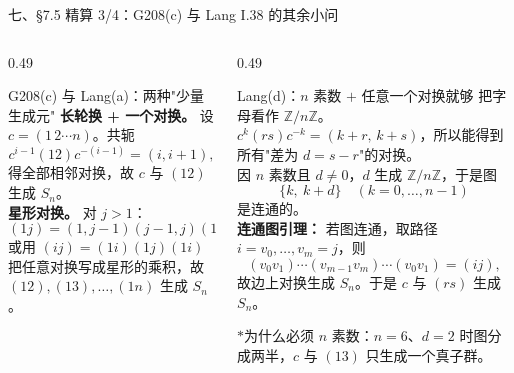 \documentclass[aspectratio=169,10pt,fontset=none]{ctexbeamer}
\newcommand{\starpt}{\textcolor{accent}{\bfseries$\ast$}}
\begin{document}
\begin{frame}[t]{七、\S7.5 精算 3/4：G208(c) 与 Lang I.38 的其余小问}
  \begin{columns}[T,onlytextwidth]
    \begin{column}{0.49\textwidth}
      \begin{block}{\footnotesize G208(c) 与 Lang(a)：两种"少量生成元"}
        \scriptsize
        \textbf{长轮换 + 一个对换。} 设 $c=(1\,2\cdots n)$。共轭
        \[ c^{i-1}(12)c^{-(i-1)}=(i,i+1), \]
        得全部相邻对换，故 $c$ 与 $(12)$ 生成 $S_n$。\\
        \textbf{星形对换。} 对 $j>1$：
        \[ (1j)=(1,j-1)(j-1,j)(1,j-1), \]
        或用 $(ij)=(1i)(1j)(1i)$ 把任意对换写成星形的乘积，故 $(12),(13),\ldots,(1n)$ 生成 $S_n$。
      \end{block}
    \end{column}
    \begin{column}{0.49\textwidth}
      \begin{block}{\footnotesize Lang(d)：$n$ 素数 $+$ 任意一个对换就够}
        \scriptsize
        把字母看作 $\mathbb Z/n\mathbb Z$。$c^k(rs)c^{-k}=(k+r,\,k+s)$，所以能得到所有"差为 $d=s-r$"的对换。\\
        因 $n$ 素数且 $d\ne0$，$d$ 生成 $\mathbb Z/n\mathbb Z$，于是图
        \[ \bigl\{k,\ k+d\bigr\}\quad(k=0,\ldots,n-1) \]
        是连通的。\\
        \textbf{连通图引理：} 若图连通，取路径 $i=v_0,\ldots,v_m=j$，则
        \[ (v_0v_1)\cdots(v_{m-1}v_m)\cdots(v_0v_1)=(ij), \]
        故边上对换生成 $S_n$。于是 $c$ 与 $(rs)$ 生成 $S_n$。
      \end{block}
      \footnotesize\color{ink!80}
      \starpt 为什么必须 $n$ 素数：$n=6$、$d=2$ 时图分成两半，$c$ 与 $(13)$ 只生成一个真子群。
    \end{column}
  \end{columns}
\end{frame}
\end{document}
